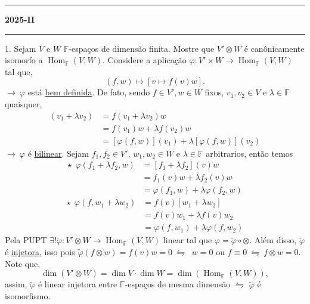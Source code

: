 \newcommand{\F}{\mathbb{F}}
\newcommand{\C}{\mathbb{C}}
\newcommand{\an}{\mathscr{A}} 
\newcommand{\Q}{\mathbb{Q}}
\renewcommand{\hom}{\operatorname{Hom}_\F}
\newcommand{\ehom}{\operatorname{End}_\F}

\-\vspace{-0.3cm}
  {\hrule \vspace{-0.15cm}
  \centering \textbf{2025-II} \vspace{0.1cm}
  \hrule}

1. Sejam \(V\) e \(W\) \(\F\)-espaços de dimensão finita. Mostre que \(V' \otimes W\) é canônicamente isomorfo a \(\hom(V,W)\). \newline
    \textcolor{gris}{Considere a aplicação \(\varphi: V' \times W \to \hom(V,W)\)  tal que, 
     \[   (f,w) \mapsto [v\mapsto f(v) w].\]
    \(\rightarrow \ \varphi\) está \underline{bem definida}. De fato, sendo \(f \in V', w \in W\) fixos, \(v_1, v_2 \in V\) e \(\lambda \in \F\) quaisquer,    
    \begin{align*}
        [\varphi(f,w)](v_1 + \lambda v_2) &= f(v_1+\lambda v_2) w \\ 
         &= f(v_1) w +\lambda f(v_2) w \\ 
        &=[\varphi(f,w)](v_1) + \lambda [\varphi(f,w)](v_2)  
    \end{align*}
    \(\rightarrow \ \varphi\) é \underline{bilinear}. Sejam \(f_1, f_2 \in V'\), \(w_1, w_2 \in W\) e \(\lambda \in \F \) arbitrarios, então temos 
    \begin{align*}
    \star \ \      \varphi(f_1 + \lambda f_2, w) &= [f_1 + \lambda f_2](v) w \\ 
        &= f_1(v) w + \lambda f_2(v) w\\ 
        &= \varphi(f_1,  w) + \lambda \varphi (f_2, w)  
    \end{align*}
    \begin{align*}
    \star \ \      \varphi(f, w_1 + \lambda w_2) &= f(v)[w_1 + \lambda w_2] \\ 
        &= f(v) w_1+ \lambda f(v) w_2 \\ 
        &= \varphi(f,  w_1) + \lambda \varphi (f, w_2) 
    \end{align*}
    Pela PUPT \(\exists ! \widetilde{\varphi}: V'\otimes W \to \hom(V,W)\) linear tal que \(\varphi = \widetilde{\varphi}\circ \otimes\). Além disso, \(\widetilde{\varphi}\) é \underline{injetora}, isso pois \(\widetilde{\varphi}(f\otimes w) = f(v) w = 0 \ \leftrightharpoons \ \) \(w=0\) ou \(f \equiv 0 \ \leftrightharpoons \ f\otimes w = 0 \). Note que, 
    \[\dim (V'\otimes W) = \dim V \cdot \dim W = \dim (\hom(V,W)), \]
    assim, \(\widetilde{\varphi}\) é linear injetora entre \(\F\)-espaços de mesma dimensão \(\leftrightharpoons\) \(\widetilde{\varphi}\) é isomorfismo. 
    } \\ 
